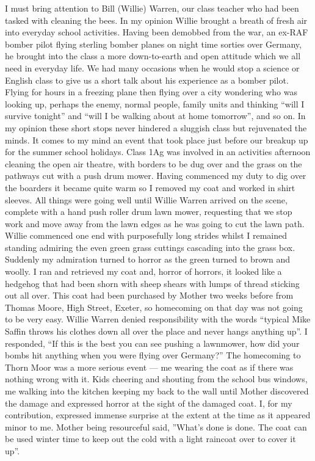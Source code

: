 I must bring attention to Bill (Willie) Warren, our class teacher who had been
tasked with cleaning the bees. In my opinion Willie brought a breath of fresh
air into everyday school activities. Having been demobbed from the war, an
ex-RAF bomber pilot flying sterling bomber planes on night time sorties over
Germany, he brought into the class a more down-to-earth and open attitude which
we all need in everyday life. We had many occasions when he would stop a
science or English class to give us a short talk about his experience as a
bomber pilot. Flying for hours in a freezing plane then flying over a city
wondering who was looking up, perhaps the enemy, normal people, family units
and thinking ``will I survive tonight'' and ``will I be walking about at home
tomorrow'', and so on. In my opinion these short stops never hindered a
sluggish class but rejuvenated the minds. It comes to my mind an event that
took place just before our breakup up for the summer school holidays. Class 1Ag
was involved in an activities afternoon cleaning the open air theatre, with
borders to be dug over and the grass on the pathways cut with a push drum
mower. Having commenced my duty to dig over the boarders it became quite warm
so I removed my coat and worked in shirt sleeves. All things were going well
until Willie Warren arrived on the scene, complete with a hand push roller drum
lawn mower, requesting that we stop work and move away from the lawn edges as
he was going to cut the lawn path. Willie commenced one end with purposefully
long strides whilst I remained standing admiring the even green grass cuttings
cascading into the grass box. Suddenly my admiration turned to horror as the
green turned to brown and woolly. I ran and retrieved my coat and, horror of
horrors, it looked like a hedgehog that had been shorn with sheep shears with
lumps of thread sticking out all over. This coat had been purchased by Mother
two weeks before from Thomas Moore, High Street, Exeter, so homecoming on that
day was not going to be very easy. Willie Warren denied responsibility with the
words ``typical Mike Saffin throws his clothes down all over the place and
never hangs anything up''. I responded, ``If this is the best you can see
pushing a lawnmower, how did your bombs hit anything when you were flying over
Germany?'' The homecoming to Thorn Moor was a more serious event --- me wearing
the coat as if there was nothing wrong with it. Kids cheering and shouting from
the school bus windows, me walking into the kitchen keeping my back to the wall
until Mother discovered the damage and expressed horror at the sight of the
damaged coat. I, for my contribution, expressed immense surprise at the extent
at the time as it appeared minor to me. Mother being resourceful said, ''What's
done is done. The coat can be used winter time to keep out the cold with a
light raincoat over to cover it up''.


